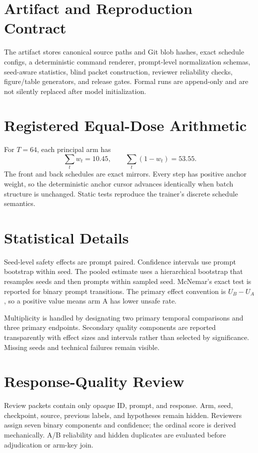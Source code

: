 \section{Artifact and Reproduction Contract}

The artifact stores canonical source paths and Git blob hashes, exact schedule configs, a deterministic command renderer, prompt-level normalization schemas, seed-aware statistics, blind packet construction, reviewer reliability checks, figure/table generators, and release gates. Formal runs are append-only and are not silently replaced after model initialization.

\section{Registered Equal-Dose Arithmetic}

For $T=64$, each principal arm has
\begin{equation}
  \sum_t w_t = 10.45, \qquad \sum_t (1-w_t)=53.55.
\end{equation}
The front and back schedules are exact mirrors. Every step has positive anchor weight, so the deterministic anchor cursor advances identically when batch structure is unchanged. Static tests reproduce the trainer's discrete schedule semantics.

\section{Statistical Details}

Seed-level safety effects are prompt paired. Confidence intervals use prompt bootstrap within seed. The pooled estimate uses a hierarchical bootstrap that resamples seeds and then prompts within sampled seed. McNemar's exact test is reported for binary prompt transitions. The primary effect convention is $U_B-U_A$, so a positive value means arm A has lower unsafe rate.

Multiplicity is handled by designating two primary temporal comparisons and three primary endpoints. Secondary quality components are reported transparently with effect sizes and intervals rather than selected by significance. Missing seeds and technical failures remain visible.

\section{Response-Quality Review}

Review packets contain only opaque ID, prompt, and response. Arm, seed, checkpoint, source, previous labels, and hypotheses remain hidden. Reviewers assign seven binary components and confidence; the ordinal score is derived mechanically. A/B reliability and hidden duplicates are evaluated before adjudication or arm-key join.

